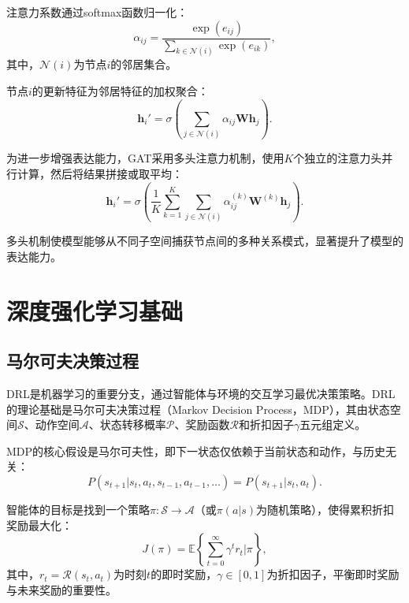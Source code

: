 注意力系数通过softmax函数归一化：
\begin{equation}
\alpha_{ij} = \frac{\exp(e_{ij})}{\sum_{k \in \mathcal{N}(i)}\exp(e_{ik})},
\end{equation}
其中，$\mathcal{N}(i)$为节点$i$的邻居集合。

节点$i$的更新特征为邻居特征的加权聚合：
\begin{equation}
\mathbf{h}_i' = \sigma\left(\sum_{j \in \mathcal{N}(i)} \alpha_{ij}\mathbf{W}\mathbf{h}_j\right).
\end{equation}

为进一步增强表达能力，GAT采用多头注意力机制，使用$K$个独立的注意力头并行计算，然后将结果拼接或取平均\cite{chaptertwo10}：
\begin{equation}
\mathbf{h}_i' = \sigma\left(\frac{1}{K}\sum_{k=1}^{K}\sum_{j \in \mathcal{N}(i)} \alpha_{ij}^{(k)}\mathbf{W}^{(k)}\mathbf{h}_j\right).
\end{equation}

多头机制使模型能够从不同子空间捕获节点间的多种关系模式，显著提升了模型的表达能力\cite{chaptertwo10}。

\section{深度强化学习基础}

\subsection{马尔可夫决策过程}

DRL是机器学习的重要分支，通过智能体与环境的交互学习最优决策策略。DRL的理论基础是马尔可夫决策过程（Markov Decision Process，MDP）\cite{chaptertwo11}，其由状态空间$\mathcal{S}$、动作空间$\mathcal{A}$、状态转移概率$\mathcal{P}$、奖励函数$\mathcal{R}$和折扣因子$\gamma$五元组定义。

MDP的核心假设是马尔可夫性，即下一状态仅依赖于当前状态和动作，与历史无关：
\begin{equation}
P(s_{t+1}|s_t, a_t, s_{t-1}, a_{t-1}, \ldots) = P(s_{t+1}|s_t, a_t).
\end{equation}

智能体的目标是找到一个策略$\pi: \mathcal{S} \to \mathcal{A}$（或$\pi(a|s)$为随机策略），使得累积折扣奖励最大化：
\begin{equation}
J(\pi) = \mathbb{E}\left\{\sum_{t=0}^{\infty}\gamma^t r_t \Big| \pi\right\},
\end{equation}
其中，$r_t = \mathcal{R}(s_t, a_t)$为时刻$t$的即时奖励，$\gamma \in [0, 1]$为折扣因子，平衡即时奖励与未来奖励的重要性\cite{chaptertwo11}。


